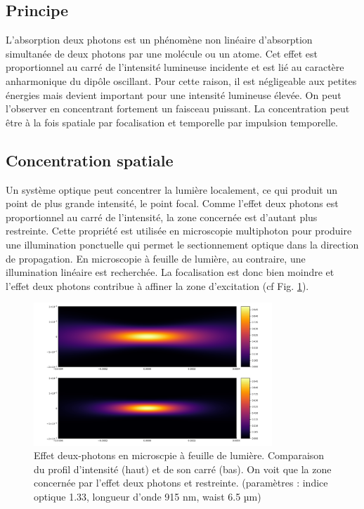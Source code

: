 
\subsection{Principe}

L'absorption deux photons est un phénomène non linéaire d'absorption simultanée de deux photons par une molécule ou un atome. Cet effet est proportionnel au carré de l'intensité lumineuse incidente et est lié au caractère anharmonique du dipôle oscillant. Pour cette raison, il est négligeable aux petites énergies mais devient important pour une intensité lumineuse élevée. On peut l'observer en concentrant fortement un faisceau puissant. La concentration peut être à la fois spatiale par focalisation et temporelle par impulsion temporelle.

\subsection{Concentration spatiale}

Un système optique peut concentrer la lumière localement, ce qui produit un point de plus grande intensité, le point focal. Comme l'effet deux photons est proportionnel au carré de l'intensité, la zone concernée est d'autant plus restreinte. Cette propriété est utilisée en microscopie multiphoton pour produire une illumination ponctuelle qui permet le sectionnement optique dans la direction de propagation. En microscopie à feuille de lumière, au contraire, une illumination linéaire est recherchée. La focalisation est donc bien moindre et l'effet deux photons contribue à affiner la zone d'excitation (cf Fig. \ref{2P-intensity-profile}).

\begin{figure}
\centering
\includegraphics[width=0.8\textwidth]{./files/profile-intensity.png}
\caption{Effet deux-photons en microscpie à feuille de lumière. Comparaison du profil d'intensité (haut) et de son carré (bas). On voit que la zone concernée par l'effet deux photons et restreinte. (paramètres : indice optique 1.33, longueur d'onde 915 nm, waist 6.5 µm)
}
\label{2P-intensity-profile}
\end{figure}


